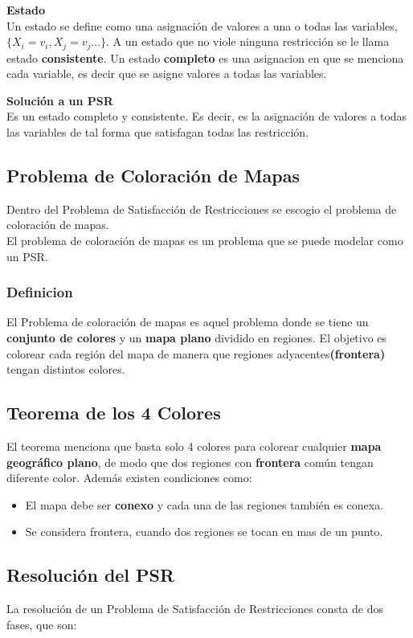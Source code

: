 \documentclass[a4paper]{article}
\begin{document}
\textbf{Estado}\\ 
Un estado se define como una asignación de valores a una o todas las variables, $\{X_i = v_i, X_j = v_j...\}$. A un estado que no viole ninguna restricción se le llama estado \textbf{consistente}. Un estado \textbf{completo} es una asignacion en que se menciona cada variable, es decir que se asigne valores a todas las variables.

\textbf{Solución a un PSR}\\
Es un estado completo y consistente. Es decir, es la asignación de valores a todas las variables de tal forma que satisfagan todas las restricción.

\subsection{Problema de Coloración de Mapas}
Dentro del Problema de Satisfacción de Restricciones se escogio el problema de coloración de mapas.\\
El problema de coloración de mapas es un problema que se puede modelar como un PSR.
\subsubsection*{Definicion}
El Problema de coloración de mapas es aquel problema donde se tiene un \textbf{conjunto de colores} y un \textbf{mapa plano} dividido en regiones. El objetivo es colorear cada región del mapa de manera que regiones adyacentes\textbf{(frontera)} tengan distintos colores.

\subsection{Teorema de los 4 Colores}
El teorema menciona que basta solo 4 colores para colorear cualquier \textbf{mapa geográfico plano}, de modo que dos regiones con \textbf{frontera} común tengan diferente color. Además existen condiciones como:
\begin{itemize}
\item El mapa debe ser \textbf{conexo} y cada una de las regiones también es conexa.
\item Se considera frontera, cuando dos regiones se tocan en mas de un punto.
\end{itemize}

\subsection{Resolución del PSR}
La resolución de un Problema de Satisfacción de Restricciones consta de dos fases, que son:
\end{document}
